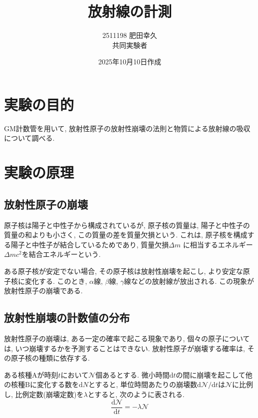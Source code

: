 \documentclass{jarticle}
\title{放射線の計測}
\author{2511198 肥田幸久 \\ 共同実験者 \\ }
\date{2025年10月10日作成}
\begin{document}
\maketitle



\section{実験の目的}

GM計数管を用いて, 放射性原子の放射性崩壊の法則と物質による放射線の吸収について調べる.



\section{実験の原理}


\subsection{放射性原子の崩壊}

原子核は陽子と中性子から構成されているが, 原子核の質量は, 陽子と中性子の質量の和よりも小さく, この質量の差を質量欠損という.
これは, 原子核を構成する陽子と中性子が結合しているためであり, 質量欠損$\Delta m$ に相当するエネルギー$\Delta mc^2$を結合エネルギーという.

ある原子核が安定でない場合, その原子核は放射性崩壊を起こし, より安定な原子核に変化する.
このとき, $\alpha$線, $\beta$線, $\gamma$線などの放射線が放出される.
この現象が放射性原子の崩壊である.


\subsection{放射性崩壊の計数値の分布}

放射性原子の崩壊は, ある一定の確率で起こる現象であり, 個々の原子については, いつ崩壊するかを予測することはできない.
放射性原子が崩壊する確率は, その原子核の種類に依存する.

ある核種$\mathrm{A}$が時刻$t$において$\mathcal{N}$個あるとする.
微小時間$\mathrm{d}t$の間に崩壊を起こして他の核種$\mathrm{B}$に変化する数を$\mathrm{d}N$とすると, 単位時間あたりの崩壊数$\mathrm{d}\mathcal{N}/\mathrm{d}t$は$\mathcal{N}$に比例し, 比例定数(崩壊定数)を$\lambda$とすると, 次のように表される.
\begin{equation}
  \frac{\mathrm{d}\mathcal{N}}{\mathrm{d}t} = -\lambda \mathcal{N}
\end{equation}
\end{document}
